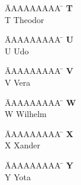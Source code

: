 \documentclass[a4paper, fleqn, headsepline, footsepline, 12pt, parskip=half]{scrartcl}
\begin{document}
\vspace*{-1.5cm}
\begin{tabbing}
	\hspace{0.0cm}  \= AAAAAAAAA \=       \hspace{2cm} \kill
	\>\textbf{T} 	\> \\
	\>T 			\>  Theodor\\
\end{tabbing}

\vspace*{-1.5cm}
\begin{tabbing}
	\hspace{0.0cm}  \= AAAAAAAAA \=       \hspace{2cm} \kill
	\>\textbf{U} 	\> \\
	\>U 			\>  Udo\\
\end{tabbing}

\vspace*{-1.5cm}
\begin{tabbing}
	\hspace{0.0cm}  \= AAAAAAAAA \=       \hspace{2cm} \kill
	\>\textbf{V} 	\> \\
	\>V 			\>  Vera\\
\end{tabbing}

\vspace*{-1.5cm}
\begin{tabbing}
	\hspace{0.0cm}  \= AAAAAAAAA \=       \hspace{2cm} \kill
	\>\textbf{W} 	\> \\
	\>W 			\>  Wilhelm\\
\end{tabbing}

\vspace*{-1.5cm}
\begin{tabbing}
	\hspace{0.0cm}  \= AAAAAAAAA \=       \hspace{2cm} \kill
	\>\textbf{X} 	\> \\
	\>X 			\>  Xander\\
\end{tabbing}

\vspace*{-1.5cm}
\begin{tabbing}
	\hspace{0.0cm}  \= AAAAAAAAA \=       \hspace{2cm} \kill
	\>\textbf{Y} 	\> \\
	\>Y 			\>  Yota\\
\end{tabbing}
\end{document}
